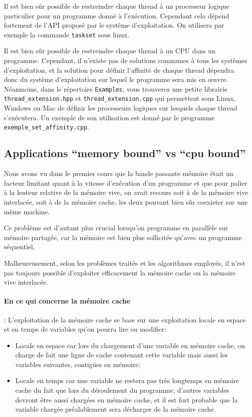 \documentclass[fleqn,11pt]{article}
\begin{document}
Il est bien sûr possible de restreindre chaque thread à un processeur logique particulier pour un programme donné à l'exécution. Cependant cela dépend fortement de l'API proposé par le système d'exploitation. On utilisera par exemple la commande \texttt{taskset} sous linux.

Il est bien sûr possible de restreindre chaque thread à un CPU dans un programme. Cependant, il n'existe pas de solutions communes à tous les systèmes d'exploitation, et la solution pour définir l'affinité de chaque thread dépendra donc du système d'exploitation sur lequel le programme sera mis en {\oe}uvre. Néanmoins, dans le répertoire \texttt{Examples}, vous trouverez une petite librairie \texttt{thread\_extension.hpp} et
\texttt{thread\_extension.cpp} qui permettent sous Linux, Windows ou Mac de définir les processeurs logiques
sur lesquels chaque thread s'exécutera. Un exemple de son utilisation est donné par le programme
\texttt{exemple\_set\_affinity.cpp}.

\subsection{Applications ``memory bound'' vs ``cpu bound''}

Nous avons vu dans le premier cours que la bande passante mémoire était un facteur limitant quant à la vitesse d'exécution d'un programme et que pour palier à la lenteur relative de la mémoire vive, on avait recours soit à de la mémoire vive interlacée, soit à de la mémoire cache, les deux pouvant bien sûr coexister sur une même machine.

Ce problème est d'autant plus crucial lorsqu'on programme en parallèle sur mémoire partagée, car la mémoire
est bien plus sollicitée qu'avec un programme séquentiel.

Malheureusement, selon les problèmes traités et les algorithmes employés, il n'est pas toujours possible d'exploiter efficacement la mémoire cache ou la mémoire vive interlacée.

\paragraph{En ce qui concerne la mémoire cache} : L'exploitation de la mémoire cache se base sur une exploitation locale en espace et en temps de variables qu'on pourra lire ou modifier:
\begin{itemize}
 \item Locale en espace car lors du chargement d'une variable en mémoire cache, on charge de fait une ligne de cache  contenant cette variable mais aussi les variables suivantes, contigües en mémoire;
 \item Locale en temps  car une variable ne restera pas très longtemps en mémoire cache du fait que lors du déroulement du programme, d'autres variables devront être aussi chargées en mémoire cache, et il est fort probable que la variable chargée préalablement sera décharger de la mémoire cache.
\end{itemize}
\end{document}
